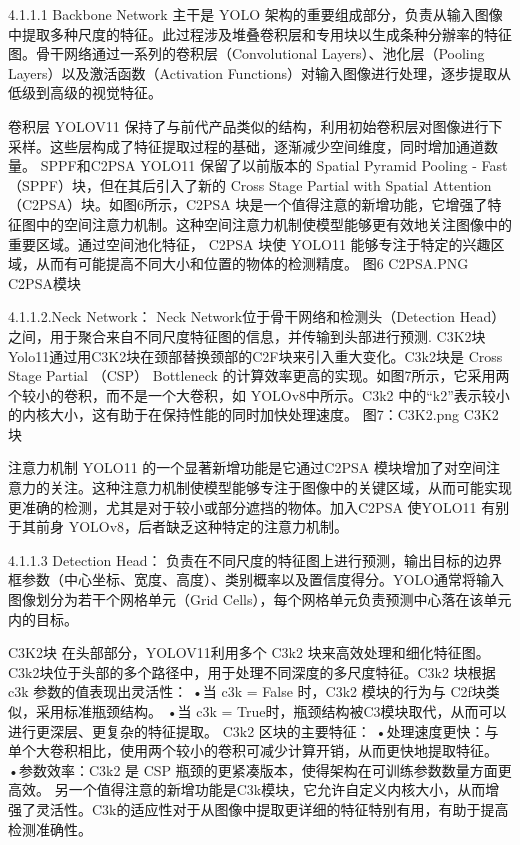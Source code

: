 4.1.1.1 Backbone Network
主干是 YOLO 架构的重要组成部分，负责从输入图像中提取多种尺度的特征。此过程涉及堆叠卷积层和专用块以生成条种分辦率的特征图。骨干网络通过一系列的卷积层（Convolutional Layers）、池化层（Pooling Layers）以及激活函数（Activation Functions）对输入图像进行处理，逐步提取从低级到高级的视觉特征。

卷积层 
YOLOV11 保持了与前代产品类似的结构，利用初始卷积层对图像进行下采样。这些层构成了特征提取过程的基础，逐渐减少空间维度，同时增加通道数量。
SPPF和C2PSA 
YOLO11 保留了以前版本的 Spatial Pyramid Pooling - Fast （SPPF）块，但在其后引入了新的 Cross Stage Partial with Spatial Attention （C2PSA）块\cite{80_ghosh_yolo11_2024}。如图6所示，C2PSA 块是一个值得注意的新增功能，它增强了特征图中的空间注意力机制。这种空间注意力机制使模型能够更有效地关注图像中的重要区域。通过空间池化特征， C2PSA 块使 YOLO11 能够专注于特定的兴趣区域，从而有可能提高不同大小和位置的物体的检测精度。
图6 C2PSA.PNG C2PSA模块

4.1.1.2.Neck Network： 
Neck Network位于骨干网络和检测头（Detection Head）之间，用于聚合来自不同尺度特征图的信息，并传输到头部进行预测.
C3K2块Yolo11通过用C3K2块在颈部替换颈部的C2F块来引入重大变化。C3k2块是 Cross Stage Partial （CSP） Bottleneck 的计算效率更高的实现。如图7所示，它采用两个较小的卷积，而不是一个大卷积，如 YOLOv8\cite{81_noauthor_what_2024}中所示。C3k2 中的“k2”表示较小的内核大小，这有助于在保持性能的同时加快处理速度\cite{75_khanam2024yolov11overviewkeyarchitectural}。
图7：C3K2.png C3K2块\cite{83_noauthor_ultralytics_nodate}


注意力机制 
YOLO11 的一个显著新增功能是它通过C2PSA 模块增加了对空间注意力的关注。这种注意力机制使模型能够专注于图像中的关键区域，从而可能实现更准确的检测，尤其是对于较小或部分遮挡的物体。加入C2PSA 使YOLO11 有别于其前身 YOLOv8，后者缺乏这种特定的注意力机制\cite{80_ghosh_yolo11_2024}\cite{75_khanam2024yolov11overviewkeyarchitectural}。


4.1.1.3 Detection Head： 负责在不同尺度的特征图上进行预测，输出目标的边界框参数（中心坐标、宽度、高度）、类别概率以及置信度得分。YOLO通常将输入图像划分为若干个网格单元（Grid Cells），每个网格单元负责预测中心落在该单元内的目标。

C3K2块
在头部部分，YOLOV11利用多个 C3k2 块来高效处理和细化特征图。C3k2块位于头部的多个路径中，用于处理不同深度的多尺度特征。C3k2 块根据 c3k 参数的值表现出灵活性： 
    •当 c3k = False 时，C3k2 模块的行为与 C2f块类似，采用标准瓶颈结构。 
    •当 c3k = True时，瓶颈结构被C3模块取代，从而可以进行更深层、更复杂的特征提取。 
C3k2 区块的主要特征： 
•处理速度更快：与单个大卷积相比，使用两个较小的卷积可减少计算开销，从而更快地提取特征。 
•参数效率：C3k2 是 CSP 瓶颈的更紧凑版本，使得架构在可训练参数数量方面更高效。
另一个值得注意的新增功能是C3k模块，它允许自定义内核大小，从而增强了灵活性。C3k的适应性对于从图像中提取更详细的特征特别有用，有助于提高检测准确性。

